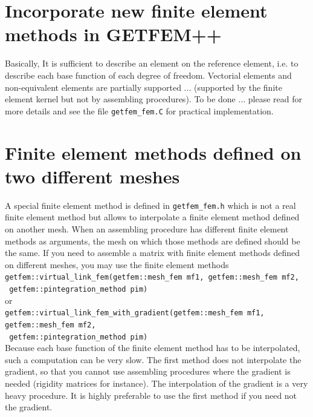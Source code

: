 \documentclass[11pt,a4paper]{article}
\begin{document}
\section{Incorporate new finite element methods in GETFEM++}

Basically, It is sufficient to describe an element on the reference element, i.e. to describe each base function of each degree of freedom. Vectorial elements and non-equivalent elements are partially supported ... (supported by the finite element kernel but not by assembling procedures). To be done ... please read \cite{BASCOMP} for more details and see the file {\tt getfem\_fem.C} for practical implementation.

\section{Finite element methods defined on two different meshes}

A special finite element method is defined in {\tt getfem\_fem.h} which is not a real finite element method but allows to interpolate a finite element method defined on another mesh. When an assembling procedure has different finite element methods as arguments, the mesh on which those methods are defined should be the same. If you need to assemble a matrix with finite element methods defined on different meshes, you may use the finite element methods\\[0.5cm]
{\tt getfem::virtual\_link\_fem(getfem::mesh\_fem mf1, getfem::mesh\_fem mf2,} \\ {\tt \mbox{}\hspace{12em} getfem::pintegration\_method pim) }\\[0.2cm]
or\\[0.2cm]
{\tt getfem::virtual\_link\_fem\_with\_gradient(getfem::mesh\_fem mf1, getfem::mesh\_fem mf2,} \\ {\tt \mbox{}\hspace{12em} getfem::pintegration\_method pim) }\\[0.5cm]
Because each base function of the finite element method has to be interpolated, such a computation can be very slow. The first method does not interpolate the gradient, so that you cannot use assembling procedures where the gradient is needed (rigidity matrices for instance). The interpolation of the gradient is a very heavy procedure. It is highly preferable to use the first method if you need not the gradient.\\[0.5cm]
\end{document}
